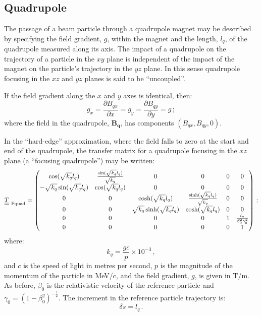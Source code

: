 \subsection{Quadrupole}

The passage of a beam particle through a quadrupole magnet may be
described by specifying the field gradient, $g$, within the magnet and
the length, $l_q$, of the quadrupole measured along its axis.
The impact of a quadrupole on the trajectory of a particle in the $xy$
plane is independent of the impact of the magnet on the particle's
trajectory in the $yz$ plane.   
In this sense quadrupole focusing in the $xz$ and $yz$ planes is said
to be ``uncoupled''. 

If the field gradient along the $x$ and $y$ axes is identical, then:
\begin{equation}
  g_x = \frac{\partial B_{qx}}{\partial x} =
  g_y = \frac{\partial B_{qy}}{\partial y} = g \, ; \label{Eq:Trnsf:gxy}
\end{equation}
where the field in the quadrupole, $\bm{B_q}$, has components
$(B_{qx}, B_{qy}, 0)$.

In the ``hard-edge'' approximation, where the field falls to zero at
the start and end of the quadrupole, the transfer matrix for a
quadrupole focusing in the $xz$ plane (a ``focusing quadrupole'') may
be written: 
\begin{equation}
  \underline{\underline{T}}_{\rm~Fquad} =
    \begin{pmatrix}
          \cos(\sqrt{k_q} l_q) & \frac{\sin(\sqrt{k_q} l_q)}{\sqrt{k_q}} & 0 & 0             & 0 & 0 \\
-\sqrt{k_q} \sin(\sqrt{k_q} l_q) &                  \cos(\sqrt{k_q} l_q) & 0 & 0             & 0 & 0 \\
          0 & 0 &           \cosh(\sqrt{k_q} l_q) & \frac{\sinh(\sqrt{k_q} l_q)}{\sqrt{k_q}} & 0 & 0 \\
          0 & 0 &  \sqrt{k_q} \sinh(\sqrt{k_q} l_q) &                  \cosh(\sqrt{k_q} l_q) & 0 & 0 \\
          0 & 0 & 0 & 0 & 1 & \frac{l_q}{\beta_0^2 \gamma_0^2} \\
          0 & 0 & 0 & 0 & 0 &                             1
        \end{pmatrix} \, ; 
\end{equation}
where:
\begin{equation}
  k_q = \frac{gc}{p} \times 10^{-3} \, ,  \label{Eq:Effectivekq}
\end{equation}
and $c$ is the speed of light in metres per second, $p$ is the
magnitude of the momentum of the particle in MeV/c, and the field
gradient, $g$, is given in T/m.
As before, $\beta_0$ is the relativistic velocity of the reference
particle and $\gamma_0=(1-\beta_0^2)^{-\frac{1}{2}}$.
The increment in the reference particle trajectory is:
\begin{equation}
  \delta s = l_q \, .
\end{equation}


